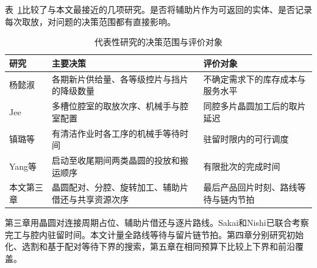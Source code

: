 表~\ref{tab:review-decisions}比较了与本文最接近的几项研究。是否将辅助片作为可返回的实体、是否记录每次取放，对问题的决策范围都有直接影响。

\begin{table}[htbp]
\centering
\caption{代表性研究的决策范围与评价对象}\label{tab:review-decisions}
\small
\begin{tabularx}{\textwidth}{@{}p{}XX@{}}
\toprule
研究 & 主要决策 & 评价对象 \\
\midrule
杨懿淑\citep{yang2009dummyphd} & 各期新片供给量、各等级控片与挡片的降级数量 & 不确定需求下的库存成本与服务水平 \\
Jee\citep{jee2021thesis} & 多槽位腔室的取放次序、机械手与腔室配置 & 同腔多片晶圆加工后的取片延迟 \\
镇璐等\citep{zhen2023cnclean} & 有清洁作业时各工序的机械手等待时间 & 驻留时限内的可行调度 \\
Yang等\citep{yang2025noncyclic} & 启动至收尾期间两类晶圆的投放和搬运顺序 & 有限批次的完成时间 \\
本文第三章 & 晶圆配对、分腔、旋转加工、辅助片借还与共享资源次序 & 最后产品回片时刻、路线等待与链内节拍 \\
\bottomrule
\end{tabularx}
\end{table}

第三章用晶圆对连接周期占位、辅助片借还与逐片路线。Sakai和Nishi已联合考察完工与腔内驻留时间\citep{sakai2017}。本文计量全路线等待与留片链节拍。第四章分别研究初始化、选割和基于配对等待下界的搜索，第五章在相同预算下比较上下界和前沿覆盖。
